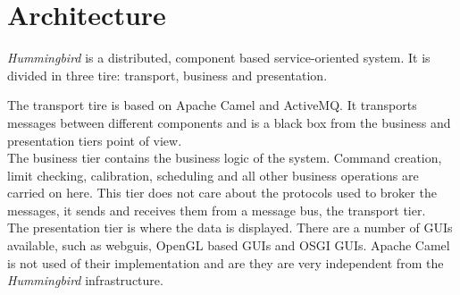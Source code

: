 \section{Architecture}

\emph{Hummingbird} is a distributed, component based service-oriented system. It is divided in three tire: transport, business and presentation.

The transport tire is based on Apache Camel and ActiveMQ. It transports messages between different components  and is a black box from the business and presentation tiers point of view.\\

The business tier contains the business logic of the system. Command creation, limit checking, calibration, scheduling and all other business operations are carried on here. This tier does not care about the protocols used to broker the messages, it sends and receives them from a message bus, the transport tier.\\

The presentation tier is where the data is displayed. There are a number of GUIs available, such as webguis, OpenGL based GUIs and OSGI GUIs. Apache Camel is not used of their implementation and are they are very independent from the \emph{Hummingbird} infrastructure.

 

\newpage